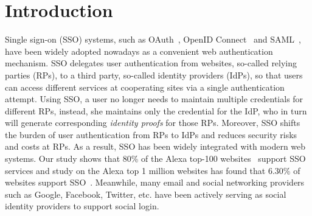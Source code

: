 \section{Introduction}
\label{sec:intro}

Single sign-on (SSO) systems, such as OAuth~\cite{rfc6749}, OpenID Connect~\cite{OpenIDConnect} and SAML~\cite{SAML}, have been widely adopted nowadays as a convenient web authentication mechanism. SSO delegates user authentication from websites, so-called relying parties (RPs), to a third party, so-called identity providers (IdPs), so that users can access different services at cooperating sites via a single authentication attempt. Using SSO, a user no longer needs to maintain multiple credentials for different RPs, instead, she maintains only the credential for the IdP, who in turn will generate corresponding \emph{identity proofs} for those RPs. Moreover, SSO shifts the burden of user authentication from RPs to IdPs and reduces security risks and costs at RPs. As a result, SSO has been widely integrated with modern web systems.
Our study shows that 80\% of the Alexa top-100 websites~\cite{Alexa} support SSO services and study on the Alexa top 1 million websites has found that 6.30\% of websites support  SSO~\cite{GhasemisharifRC18}.
Meanwhile, many email and social networking providers such as Google, Facebook, Twitter, etc. have been actively serving as social identity providers to support social login.



